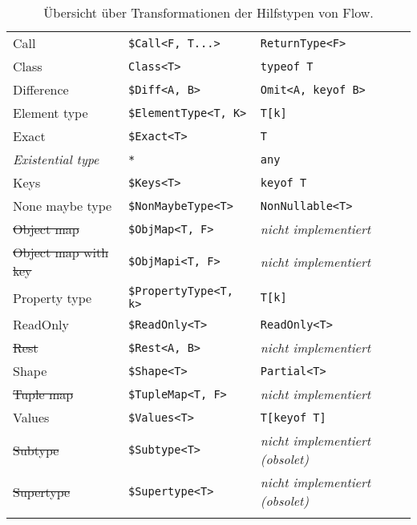 \begin{footnotesize}
\begin{longtabu} to 
  \midrule
   &  &   \\
  \midrule
  \endhead
  Call                        & \texttt{\$Call<F, T...>}        & \texttt{ReturnType<F>}        \\
  Class                       & \texttt{Class<T>}               & \texttt{typeof T}             \\
  Difference                  & \texttt{\$Diff<A, B>}           & \texttt{Omit<A, keyof B>}     \\
  Element type                & \texttt{\$ElementType<T, K>}    & \texttt{T[k]}                 \\
  Exact                       & \texttt{\$Exact<T>}             & \texttt{T}                    \\
  \textit{Existential type}   & \texttt{*}                      & \texttt{any}                  \\
  Keys                        & \texttt{\$Keys<T>}              & \texttt{keyof T}              \\
  None maybe type             & \texttt{\$NonMaybeType<T>}      & \texttt{NonNullable<T>}       \\
  \sout{Object map}           & \texttt{\$ObjMap<T, F>}         & \textit{nicht implementiert}  \\
  \sout{Object map with key}  & \texttt{\$ObjMapi<T, F>}        & \textit{nicht implementiert}  \\
  Property type               & \texttt{\$PropertyType<T, k>}   & \texttt{T[k]}                 \\
  ReadOnly                    & \texttt{\$ReadOnly<T>}          & \texttt{ReadOnly<T>}          \\
  \sout{Rest}                 & \texttt{\$Rest<A, B>}           & \textit{nicht implementiert}  \\
  Shape                       & \texttt{\$Shape<T>}             & \texttt{Partial<T>}           \\
  \sout{Tuple map}            & \texttt{\$TupleMap<T, F>}       & \textit{nicht implementiert}  \\
  Values                      & \texttt{\$Values<T>}            & \texttt{T[keyof T]}           \\
  \sout{Subtype}              & \texttt{\$Subtype<T>}           & \textit{nicht implementiert (obsolet)} \\
  \sout{Supertype}            & \texttt{\$Supertype<T>}         & \textit{nicht implementiert (obsolet)} \\
  \midrule
  \caption{Übersicht über Transformationen der Hilfstypen von Flow.}
  \label{tab:transformation-utility-types}
\end{longtabu}
\end{footnotesize}
